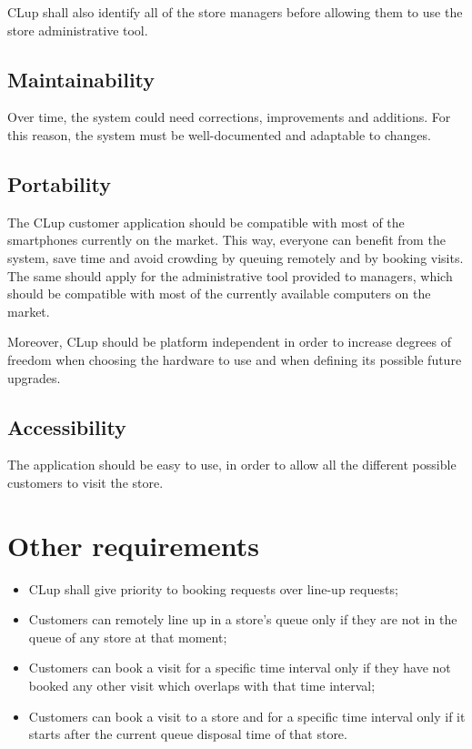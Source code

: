 \documentclass[a4paper,oneside,11pt]{book}   %
\begin{document}
    CLup shall also identify all of the store managers before allowing them to use the store administrative tool.
    
    \subsection{Maintainability}
    Over time, the system could need corrections, improvements and additions. For this reason, the system must be well-documented and adaptable to changes.
    
    \subsection{Portability}
    The CLup customer application should be compatible with most of the smartphones currently on the market. This way, everyone can benefit from the system, save time and avoid crowding by queuing remotely and by booking visits. The same should apply for the administrative tool provided to managers, which should be compatible with most of the currently available computers on the market.\par
    Moreover, CLup should be platform independent in order to increase degrees of freedom when choosing the hardware to use and when defining its possible future upgrades.
    
    \subsection{Accessibility}
    The application should be easy to use, in order to allow all the different possible customers to visit the store.
    
    \section{Other requirements}
    \begin{itemize}
        \item CLup shall give priority to booking requests over line-up requests; \item Customers can remotely line up in a store’s queue only if they are not in the queue of any store at that moment;  
        \item Customers can book a visit for a specific time interval only if they have not booked any other visit which overlaps with that time interval;
        \item Customers can book a visit to a store and for a specific time interval only if it starts after the current queue disposal time of that store.
    \end{itemize}
   
\end{document}
